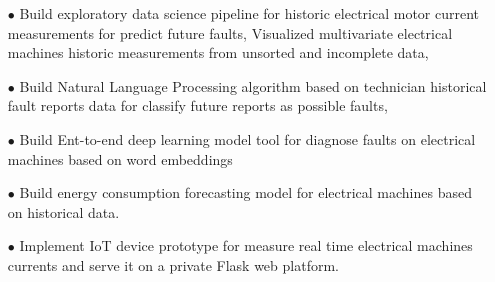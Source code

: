 \documentclass[english,narrow]{europecv}
\begin{document}
\begin{europecv}
		\ecvpersonalinfo
		\ecvitem{}{}
\ecvlanguageheader{(*)}
\ecvlanguagefooter{(*)}




{
\begin{itemize}
  \item [$\bullet$] Build exploratory data science pipeline for historic electrical motor current measurements for predict future faults, Visualized multivariate electrical machines historic measurements from unsorted and incomplete data,
  \item [$\bullet$] Build Natural Language Processing algorithm based on technician historical fault reports data for classify future reports as possible faults,
  \item [$\bullet$]  Build Ent-to-end deep learning model tool for diagnose faults on electrical machines based on word embeddings
  \item [$\bullet$] Build energy consumption forecasting model for electrical machines based on historical data.
  \item [$\bullet$] Implement IoT device prototype for measure real time electrical machines currents and serve it on a private Flask web platform.
\end{itemize}
}



\end{europecv}
\end{document}
